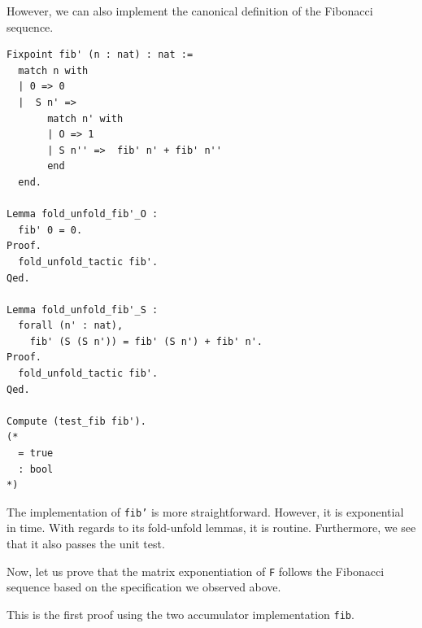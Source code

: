 \documentclass{article}
\begin{document}
However, we can also implement the canonical definition of the Fibonacci sequence. 

\begin{lstlisting}
Fixpoint fib' (n : nat) : nat :=
  match n with
  | 0 => 0
  |  S n' =>
       match n' with
       | O => 1
       | S n'' =>  fib' n' + fib' n''
       end
  end.

Lemma fold_unfold_fib'_O :
  fib' 0 = 0.
Proof.
  fold_unfold_tactic fib'.
Qed.

Lemma fold_unfold_fib'_S :
  forall (n' : nat),
    fib' (S (S n')) = fib' (S n') + fib' n'.
Proof.
  fold_unfold_tactic fib'.
Qed.

Compute (test_fib fib').
(* 
  = true
  : bool
*)
\end{lstlisting}

The implementation of \texttt{fib'} is more straightforward. However, it is exponential in time. With regards to its fold-unfold lemmas, it is routine. Furthermore, we see that it also passes the unit test.

Now, let us prove that the matrix exponentiation of \texttt{F} follows the Fibonacci sequence based on the specification we observed above.

This is the first proof using the two accumulator implementation \texttt{fib}.
\end{document}
